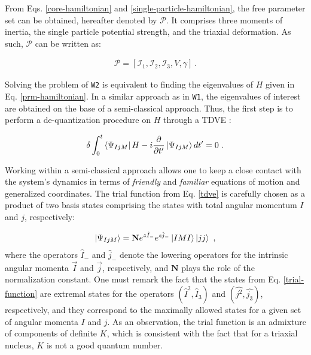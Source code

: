 \documentclass[11pt]{article}
\begin{document}
From Eqs. \ref{core-hamiltonian} and \ref{single-particle-hamiltonian}, the free parameter set can be obtained, hereafter denoted by $\mathcal{P}$. It comprises three moments of inertia, the single particle potential strength, and the triaxial deformation. As such, $\mathcal{P}$ can be written as:

\begin{align}
    \mathcal{P}=\left[\mathcal{I}_1,\mathcal{I}_2,\mathcal{I}_3,V,\gamma\right]\ .
    \label{parameter-set}
\end{align}

Solving the problem of \texttt{W2} is equivalent to finding the eigenvalues of $H$ given in Eq. \ref{prm-hamiltonian}. In a similar approach as in \texttt{W1}, the eigenvalues of interest are obtained on the base of a semi-classical approach. Thus, the first step is to perform a de-quantization procedure on $H$ through a TDVE \cite{raduta2007semiclassical,budaca2018tilted,raduta2017semiclassical}:

\begin{align}
    \delta\int_0^t\bra{\Psi_{IjM}}H-i\frac{\partial}{\partial t'}\ket{\Psi_{IjM}}dt'=0\ .
    \label{tdve}
\end{align}

Working within a semi-classical approach allows one to keep a close contact with the system's dynamics in terms of \emph{friendly} and \emph{familiar} equations of motion and generalized coordinates. The trial function from Eq. \ref{tdve} is carefully chosen as a product of two basis states comprising the states with total angular momentum $I$ and $j$, respectively:

\begin{align}
    \ket{\Psi_{IjM}}=\mathbf{N}e^{z\hat{I}_-}e^{s\hat{j}_-}\ket{IMI}\ket{jj}\ ,
    \label{trial-function}
\end{align}
where the operators $\hat{I}_-$ and $\hat{j}_-$ denote the lowering operators for the intrinsic angular momenta $\vec{I}$ and $\vec{j}$, respectively, and $\mathbf{N}$ plays the role of the normalization constant. One must remark the fact that the states from Eq. \ref{trial-function} are extremal states for the operators $(\hat{I}^2,\hat{I}_3)$ and $(\hat{j^2},\hat{j_3})$, respectively, and they correspond to the maximally allowed states for a given set of angular momenta $I$ and $j$. As an observation, the trial function is an admixture of components of definite $K$, which is consistent with the fact that for a triaxial nucleus, $K$ is not a good quantum number.
\end{document}
